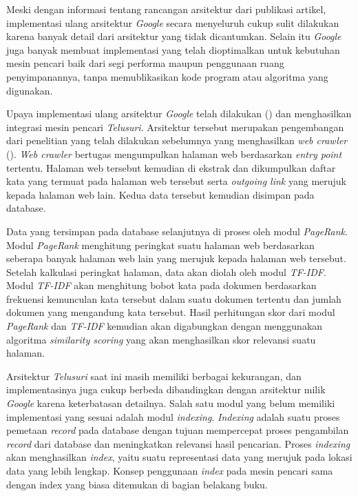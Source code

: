 Meski dengan informasi tentang rancangan arsitektur dari publikasi artikel,
implementasi ulang arsitektur \emph{Google} secara menyeluruh cukup sulit
dilakukan karena banyak detail dari arsitektur yang tidak dicantumkan. Selain
itu \emph{Google} juga banyak membuat implementasi yang telah dioptimalkan untuk
kebutuhan mesin pencari baik dari segi performa maupun penggunaan ruang
penyimpanannya, tanpa memublikasikan kode program atau algoritma yang digunakan.

Upaya implementasi ulang arsitektur \emph{Google} telah dilakukan
(\cite{lazuardy2023search}) dan menghasilkan integrasi mesin pencari
\textit{Telusuri}. Arsitektur tersebut merupakan pengembangan dari penelitian
yang telah dilakukan sebelumnya yang menghasilkan \emph{web crawler}
(\cite{fathan2021crawler}). \emph{Web crawler} bertugas mengumpulkan halaman web
berdasarkan \emph{entry point} tertentu. Halaman web tersebut kemudian di ekstrak
dan dikumpulkan daftar kata yang termuat pada halaman web tersebut serta
\emph{outgoing link} yang merujuk kepada halaman web lain. Kedua data tersebut
kemudian disimpan pada database.

Data yang tersimpan pada database selanjutnya di proses oleh modul
\emph{PageRank}. Modul \emph{PageRank} menghitung peringkat suatu halaman web
berdasarkan seberapa banyak halaman web lain yang merujuk kepada halaman web
tersebut. Setelah kalkulasi peringkat halaman, data akan diolah oleh modul
\emph{TF-IDF}. Modul \emph{TF-IDF} akan menghitung bobot kata pada dokumen
berdasarkan frekuensi kemunculan kata tersebut dalam suatu dokumen tertentu dan
jumlah dokumen yang mengandung kata tersebut. Hasil perhitungan skor dari modul
\emph{PageRank} dan \emph{TF-IDF} kemudian akan digabungkan dengan menggunakan
algoritma \emph{similarity scoring} yang akan menghasilkan skor relevansi suatu
halaman.

Arsitektur \textit{Telusuri} saat ini masih memiliki berbagai kekurangan, dan
implementasinya juga cukup berbeda dibandingkan dengan arsitektur milik
\emph{Google} karena keterbatasan detailnya. Salah satu modul yang belum
memiliki implementasi yang sesuai adalah modul \emph{indexing}. \emph{Indexing}
adalah suatu proses pemetaan \emph{record} pada database dengan tujuan
mempercepat proses pengambilan \emph{record} dari database dan meningkatkan
relevansi hasil pencarian. Proses \emph{indexing} akan menghasilkan
\emph{index}, yaitu suatu representasi data yang merujuk pada lokasi data yang
lebih lengkap. Konsep penggunaan \emph{index} pada mesin pencari sama dengan
index yang biasa ditemukan di bagian belakang buku.

